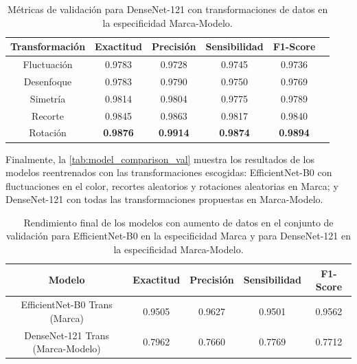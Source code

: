 \begin{table}[H]
	\centering
	\begin{adjustbox}
		{width=0.8\textwidth}
		\begin{tabular}{|c|c|c|c|c|c|}
			\hline
			\textbf{Transformación} & \textbf{Exactitud} & \textbf{Precisión} & \textbf{Sensibilidad} & \textbf{F1-Score} \\
			\hline
			Fluctuación             & 0.9783             & 0.9728             & 0.9745                & 0.9736            \\
			\hline
			Desenfoque              & 0.9783             & 0.9790             & 0.9750                & 0.9769            \\
			\hline
			Simetría                & 0.9814             & 0.9804             & 0.9775                & 0.9789            \\
			\hline
			Recorte                 & 0.9845             & 0.9863             & 0.9817                & 0.9840            \\
			\hline
			Rotación                & \textbf{0.9876}    & \textbf{0.9914}    & \textbf{0.9874}       & \textbf{0.9894}   \\
			\hline
		\end{tabular}
	\end{adjustbox}
	\caption{Métricas de validación para DenseNet-121 con transformaciones de
		datos en la especificidad Marca-Modelo.}
	\label{tab:transformation_metrics-mm}
\end{table}

Finalmente, la \autoref{tab:model_comparison_val} muestra los resultados de los
modelos reentrenados con las transformaciones escogidas: EfficientNet-B0 con fluctuaciones
en el color, recortes aleatorios y rotaciones aleatorias en Marca; y DenseNet-121
con todas las transformaciones propuestas en Marca-Modelo.

\begin{table}[H]
	\centering
	\begin{adjustbox}
		{width=0.85\textwidth}
		\begin{tabular}{|c|c|c|c|c|}
			\hline
			\textbf{Modelo}                   & \textbf{Exactitud} & \textbf{Precisión} & \textbf{Sensibilidad} & \textbf{F1-Score} \\
			\hline
			EfficientNet-B0 Trans (Marca)     & 0.9505             & 0.9627             & 0.9501                & 0.9562            \\
			\hline
			\hline
			DenseNet-121 Trans (Marca-Modelo) & 0.7962             & 0.7660             & 0.7769                & 0.7712            \\
			\hline
		\end{tabular}
	\end{adjustbox}
	\caption{Rendimiento final de los modelos con aumento de datos en el conjunto
		de validación para EfficientNet-B0 en la especificidad Marca y para DenseNet-121
		en la especificidad Marca-Modelo. }
	\label{tab:model_comparison_val}
\end{table}

